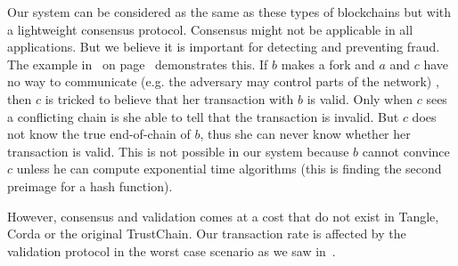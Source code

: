 Our system can be considered as the same as these types of blockchains but with a lightweight consensus protocol.
Consensus might not be applicable in all applications.
But we believe it is important for detecting and preventing fraud.
The example in~ on page~\pageref{fig:trustchain-bad} demonstrates this.
If $b$ makes a fork and $a$ and $c$ have no way to communicate (e.g. the adversary may control parts of the network) ,
then $c$ is tricked to believe that her transaction with $b$ is valid.
Only when $c$ sees a conflicting chain is she able to tell that the transaction is invalid.
But $c$ does not know the true end-of-chain of $b$, thus she can never know whether her transaction is valid.
This is not possible in our system because $b$ cannot convince $c$ unless he can compute exponential time algorithms
(this is finding the second preimage for a hash function).

However, consensus and validation comes at a cost that do not exist in Tangle, Corda or the original TrustChain.
Our transaction rate is affected by the validation protocol in the worst case scenario as we saw in~.

